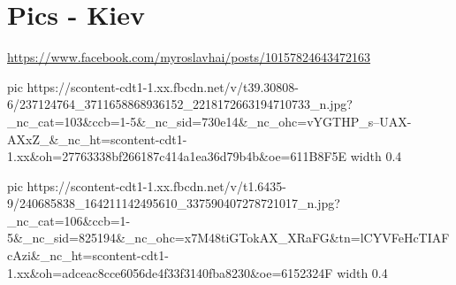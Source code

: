  
 
 
 
 
\section{Pics - Kiev}
\label{sec:pics.kiev}

\url{https://www.facebook.com/myroslavhai/posts/10157824643472163}

\ifcmt
  pic https://scontent-cdt1-1.xx.fbcdn.net/v/t39.30808-6/237124764_3711658868936152_2218172663194710733_n.jpg?_nc_cat=103&ccb=1-5&_nc_sid=730e14&_nc_ohc=vYGTHP_s--UAX-AXxZ_&_nc_ht=scontent-cdt1-1.xx&oh=27763338bf266187c414a1ea36d79b4b&oe=611B8F5E
  width 0.4

  pic https://scontent-cdt1-1.xx.fbcdn.net/v/t1.6435-9/240685838_164211142495610_337590407278721017_n.jpg?_nc_cat=106&ccb=1-5&_nc_sid=825194&_nc_ohc=x7M48tiGTokAX_XRaFG&tn=lCYVFeHcTIAFcAzi&_nc_ht=scontent-cdt1-1.xx&oh=adceac8cce6056de4f33f3140fba8230&oe=6152324F
  width 0.4
\fi

